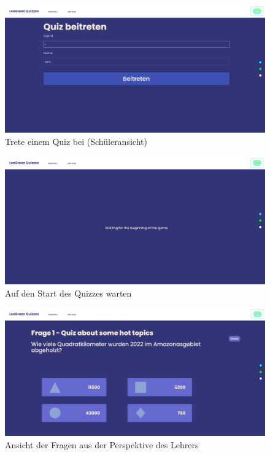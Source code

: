 \begin{figure}
    \centering
    \includegraphics[scale=0.3]{pics/image (6).png}
    \caption{Trete einem Quiz bei (Schüleransicht)}
    \label{fig:impl:img7}
\end{figure}
\begin{figure}
    \centering
    \includegraphics[scale=0.3]{pics/image (7).png}
    \caption{Auf den Start des Quizzes warten}
    \label{fig:impl:img8}
\end{figure}
\begin{figure}
    \centering
    \includegraphics[scale=0.3]{pics/image (8).png}
    \caption{Ansicht der Fragen aus der Perspektive des Lehrers}
    \label{fig:impl:img9}
\end{figure}
